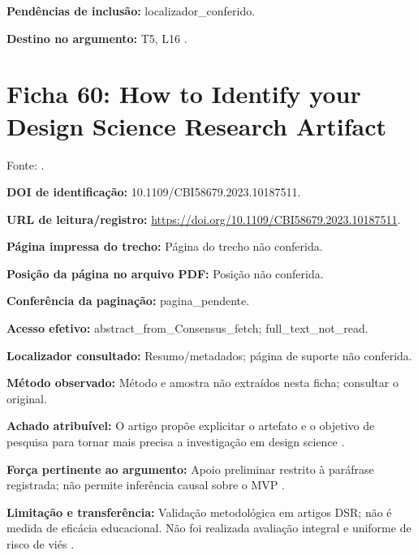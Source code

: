 \noindent\textbf{Pendências de inclusão:} localizador\_conferido.\par\medskip

\noindent\textbf{Destino no argumento:} T5, L16 .

\clearpage\section*{Ficha 60: How to Identify your Design Science Research Artifact}

Fonte: \citet{eng07}.

\noindent\textbf{DOI de identificação:} 10.1109/CBI58679.2023.10187511.\par\medskip

\noindent\textbf{URL de leitura/registro:} \url{https://doi.org/10.1109/CBI58679.2023.10187511}.\par\medskip

\noindent\textbf{Página impressa do trecho:} Página do trecho não conferida.\par\medskip

\noindent\textbf{Posição da página no arquivo PDF:} Posição não conferida.\par\medskip

\noindent\textbf{Conferência da paginação:} pagina\_pendente.\par\medskip

\noindent\textbf{Acesso efetivo:} abstract\_from\_Consensus\_fetch; full\_text\_not\_read.\par\medskip

\noindent\textbf{Localizador consultado:} Resumo/metadados; página de suporte não conferida.\par\medskip

\noindent\textbf{Método observado:} Método e amostra não extraídos nesta ficha; consultar o original.\par\medskip

\noindent\textbf{Achado atribuível:} O artigo propõe explicitar o artefato e o objetivo de pesquisa para tornar mais precisa a investigação em design science \citep{eng07}.\par\medskip

\noindent\textbf{Força pertinente ao argumento:} Apoio preliminar restrito à paráfrase registrada; não permite inferência causal sobre o MVP \citep{eng07}.\par\medskip

\noindent\textbf{Limitação e transferência:} Validação metodológica em artigos DSR; não é medida de eficácia educacional. Não foi realizada avaliação integral e uniforme de risco de viés \citep{eng07}.\par\medskip

